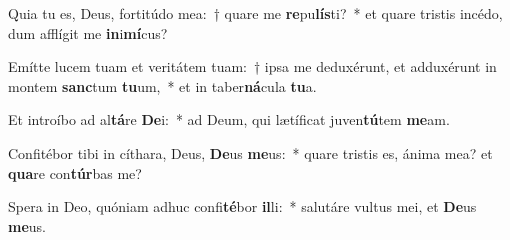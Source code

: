 \item Quia tu es, Deus, fortitúdo mea:~† quare me \textbf{re}pu\textbf{lís}ti?~* et quare tristis incédo, dum afflígit me \textbf{in}i\textbf{mí}cus?
\item Emítte lucem tuam et veritátem tuam:~† ipsa me deduxérunt, et adduxérunt in montem \textbf{sanc}tum \textbf{tu}um,~* et in taber\textbf{ná}cula \textbf{tu}a.
\item Et introíbo ad al\textbf{tá}re \textbf{De}i:~* ad Deum, qui lætíficat juven\textbf{tú}tem \textbf{me}am.
\item Confitébor tibi in cíthara, Deus, \textbf{De}us \textbf{me}us:~* quare tristis es, ánima mea? et \textbf{qua}re con\textbf{túr}bas me?
\item Spera in Deo, quóniam adhuc confi\textbf{té}bor \textbf{il}li:~* salutáre vultus mei, et \textbf{De}us \textbf{me}us.
